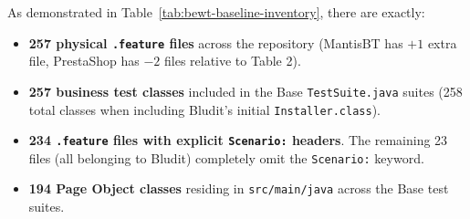 \documentclass[pdflatex,sn-mathphys-num]{sn-jnl}
\begin{document}
\begin{table}[t]
\caption{Empirical physical repository audit of the original BEWT benchmark baseline (pinned at commit \texttt{0501249}).}\label{tab:bewt-baseline-inventory}
\centering
\scriptsize
{}
\end{table}

As demonstrated in Table~\ref{tab:bewt-baseline-inventory}, there are exactly:
\begin{itemize}
    \item \textbf{257 physical \texttt{.feature} files} across the repository (MantisBT has $+1$ extra file, PrestaShop has $-2$ files relative to Table 2).
    \item \textbf{257 business test classes} included in the Base \texttt{TestSuite.java} suites (258 total classes when including Bludit's initial \texttt{Installer.class}).
    \item \textbf{234 \texttt{.feature} files with explicit \texttt{Scenario:} headers}. The remaining 23 files (all belonging to Bludit) completely omit the \texttt{Scenario:} keyword.
    \item \textbf{194 Page Object classes} residing in \texttt{src/main/java} across the Base test suites.
\end{itemize}
\end{document}
